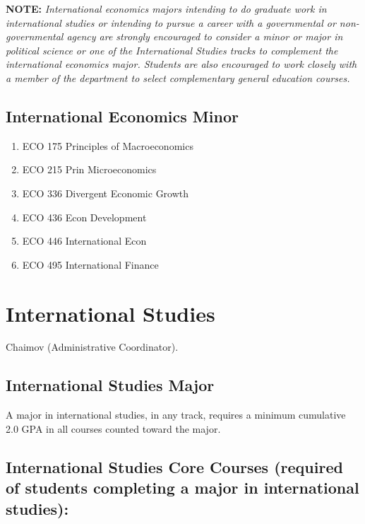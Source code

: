 \documentclass[
  letterpaper,
]{scrbook}
\providecommand{\tightlist}{%
  \setlength{\itemsep}{0pt}\setlength{\parskip}{0pt}}
\begin{document}
\textbf{NOTE:} \emph{International economics majors intending to do
graduate work in international studies or intending to pursue a career
with a governmental or non-governmental agency are strongly encouraged
to consider a minor or major in political science or one of the
International Studies tracks to complement the international economics
major. Students are also encouraged to work closely with a member of the
department to select complementary general education courses. }

\hypertarget{international-economics-minor}{%
\subsection{International Economics
Minor}\label{international-economics-minor}}

\begin{enumerate}
\def\labelenumi{\arabic{enumi}.}
\tightlist
\item
  ECO 175 Principles of Macroeconomics
\item
  ECO 215 Prin Microeconomics
\item
  ECO 336 Divergent Economic Growth
\item
  ECO 436 Econ Development
\item
  ECO 446 International Econ
\item
  ECO 495 International Finance
\end{enumerate}

\hypertarget{sec-international-studies}{%
\section{International Studies}\label{sec-international-studies}}

Chaimov (Administrative Coordinator).

\hypertarget{international-studies-major}{%
\subsection{International Studies
Major}\label{international-studies-major}}

A major in international studies, in any track, requires a minimum
cumulative 2.0 GPA in all courses counted toward the major.

\hypertarget{international-studies-core-courses-required-of-students-completing-a-major-in-international-studies}{%
\subsection{International Studies Core Courses (required of students
completing a major in international
studies):}\label{international-studies-core-courses-required-of-students-completing-a-major-in-international-studies}}
\end{document}
